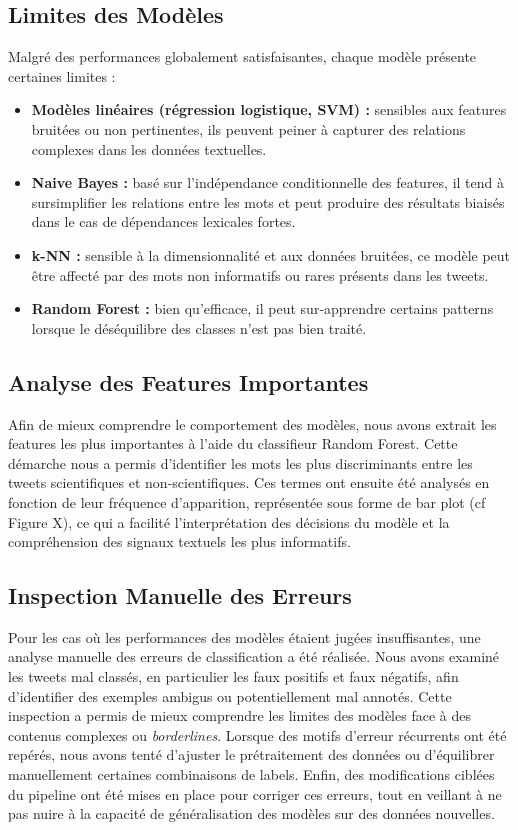 \subsection{Limites des Modèles}\label{subsec:limites-des-modeles}
Malgré des performances globalement satisfaisantes, chaque modèle présente certaines limites :
\begin{itemize}
  \item \textbf{Modèles linéaires (régression logistique, SVM) :} sensibles aux features bruitées ou non pertinentes, ils peuvent peiner à capturer des relations complexes dans les données textuelles.
  \item \textbf{Naive Bayes :} basé sur l’indépendance conditionnelle des features, il tend à sursimplifier les relations entre les mots et peut produire des résultats biaisés dans le cas de dépendances lexicales fortes.
  \item \textbf{k-NN :} sensible à la dimensionnalité et aux données bruitées, ce modèle peut être affecté par des mots non informatifs ou rares présents dans les tweets.
  \item \textbf{Random Forest :} bien qu’efficace, il peut sur-apprendre certains patterns lorsque le déséquilibre des classes n’est pas bien traité.
\end{itemize}

\subsection{Analyse des Features Importantes}\label{subsec:analyse-des-features-importantes}
Afin de mieux comprendre le comportement des modèles, nous avons extrait les features les plus importantes à l’aide du classifieur Random Forest.
Cette démarche nous a permis d’identifier les mots les plus discriminants entre les tweets scientifiques et non-scientifiques.
Ces termes ont ensuite été analysés en fonction de leur fréquence d’apparition, représentée sous forme de bar plot (cf Figure X), ce qui a facilité l’interprétation des décisions du modèle et la compréhension des signaux textuels les plus informatifs.

\subsection{Inspection Manuelle des Erreurs}\label{subsec:inspection-manuelle-des-erreurs}
Pour les cas où les performances des modèles étaient jugées insuffisantes, une analyse manuelle des erreurs de classification a été réalisée.
Nous avons examiné les tweets mal classés, en particulier les faux positifs et faux négatifs, afin d’identifier des exemples ambigus ou potentiellement mal annotés.
Cette inspection a permis de mieux comprendre les limites des modèles face à des contenus complexes ou \textit{borderlines}.
Lorsque des motifs d’erreur récurrents ont été repérés, nous avons tenté d’ajuster le prétraitement des données ou d’équilibrer manuellement certaines combinaisons de labels.
Enfin, des modifications ciblées du pipeline ont été mises en place pour corriger ces erreurs, tout en veillant à ne pas nuire à la capacité de généralisation des modèles sur des données nouvelles.

